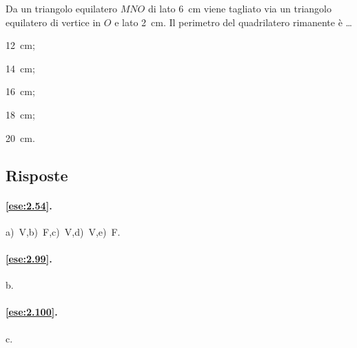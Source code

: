 \begin{esercizio}
\label{ese:2.100}
Da un triangolo equilatero $MNO$ di lato 6~cm viene tagliato via un 
triangolo equilatero di vertice in $O$ e lato 2~cm. Il perimetro del 
quadrilatero rimanente è \ldots
\begin{multicols}{5}
\begin{enumeratea}
\item 12~cm;
\item 14~cm;
\item 16~cm;
\item 18~cm;
\item 20~cm.
\end{enumeratea}
\end{multicols}
\end{esercizio}


\subsection{Risposte}

\begingroup
\hypersetup{linkcolor=black}

\paragraph{\ref{ese:2.54}.}
a)~V,\quad b)~F,\quad c)~V,\quad d)~V,\quad e)~F.

\paragraph{\ref{ese:2.99}.}
b.

\paragraph{\ref{ese:2.100}.}
c.

\endgroup

